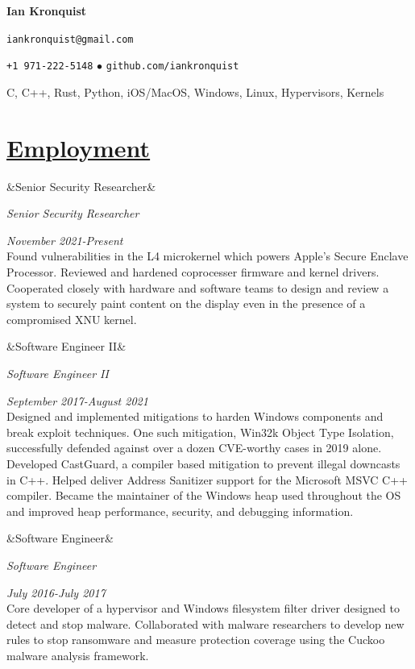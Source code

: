 \documentclass[11pt]{article}
\newcommand{\heading}[1]{
    \section*{\uline{#1 \hfill}}
}
\newcommand{\squish}{
    \setlength{\itemsep}{0.5pt}
    \setlength{\parskip}{6pt}
    \setlength{\parsep}{0.5pt}
}
\newcommand{\when}[1]{
    \hfill \emph{#1}
}
\newcommand{\experience}[3]{
    \ifx&#2&
        \item[{#1}]
    \else
\item[{#1}] \emph{#2}
    \fi
    \when{#3}\\
}
\newcommand{\contact}[5]{
    \centerline{
        \large
        \texttt{#1}
    }
	\centerline{
        \texttt{#2}
        $\bullet$
		\texttt{#3}
	}

}
\begin{document}
\centerline{{\LARGE \bf Ian Kronquist}}
\vspace{3ex}

\contact{iankronquist@gmail.com}
		{+1 971-222-5148}
		{github.com/iankronquist}\\

    \centerline{C, C++, Rust, Python, iOS/MacOS, Windows, Linux, Hypervisors, Kernels}

\heading{Employment}
\begin{description}
\vspace{1ex}
        \experience{Apple, Kernel Systems Red Team \& Coprocessors Red Team}
           {Senior Security Researcher}
           {November 2021-Present}
		Found vulnerabilities in the L4 microkernel which powers Apple's
		Secure Enclave Processor. Reviewed and hardened coprocesser firmware
		and kernel drivers.  Cooperated closely with hardware and software
		teams to design and review a system to securely paint content on the
		display even in the presence of a compromised XNU kernel.

        \experience{Microsoft, Platform Sec. \& Kernel Sec. Teams}
           {Software Engineer II}
           {September 2017-August 2021}
		Designed and implemented mitigations to harden Windows components and
		break exploit techniques. One such mitigation, Win32k Object Type
		Isolation, successfully defended against over a dozen CVE-worthy cases
		in 2019 alone. Developed CastGuard, a compiler based mitigation to
		prevent illegal downcasts in C++. Helped deliver Address Sanitizer
		support for the Microsoft MSVC C++ compiler. Became the maintainer of
		the Windows heap used throughout the OS and improved heap performance,
		security, and debugging information.
\experience{Barkly Protects, Protection Team}
           {Software Engineer}
           {July 2016-July 2017}
		Core developer of a hypervisor and Windows filesystem filter driver
		designed to detect and stop malware. Collaborated with malware
		researchers to develop new rules to stop ransomware and measure
		protection coverage using the Cuckoo malware analysis framework.


\end{description}
\end{document}

